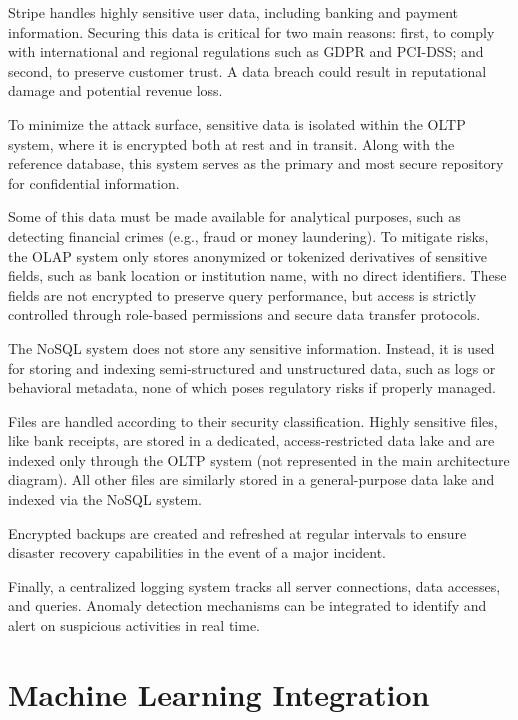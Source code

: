 \documentclass[11pt,a4paper,computermodern]{article}
\begin{document}
Stripe handles highly sensitive user data, including banking and payment information. Securing this data is critical for two main reasons: first, to comply with international and regional regulations such as GDPR and PCI-DSS; and second, to preserve customer trust. A data breach could result in reputational damage and potential revenue loss.

To minimize the attack surface, sensitive data is isolated within the OLTP system, where it is encrypted both at rest and in transit. Along with the reference database, this system serves as the primary and most secure repository for confidential information.

Some of this data must be made available for analytical purposes, such as detecting financial crimes (e.g., fraud or money laundering). To mitigate risks, the OLAP system only stores anonymized or tokenized derivatives of sensitive fields, such as bank location or institution name, with no direct identifiers. These fields are not encrypted to preserve query performance, but access is strictly controlled through role-based permissions and secure data transfer protocols.

The NoSQL system does not store any sensitive information. Instead, it is used for storing and indexing semi-structured and unstructured data, such as logs or behavioral metadata, none of which poses regulatory risks if properly managed.

Files are handled according to their security classification. Highly sensitive files, like bank receipts, are stored in a dedicated, access-restricted data lake and are indexed only through the OLTP system (not represented in the main architecture diagram). All other files are similarly stored in a general-purpose data lake and indexed via the NoSQL system.

Encrypted backups are created and refreshed at regular intervals to ensure disaster recovery capabilities in the event of a major incident.

Finally, a centralized logging system tracks all server connections, data accesses, and queries. Anomaly detection mechanisms can be integrated to identify and alert on suspicious activities in real time.


\section*{Machine Learning Integration}
\end{document}

